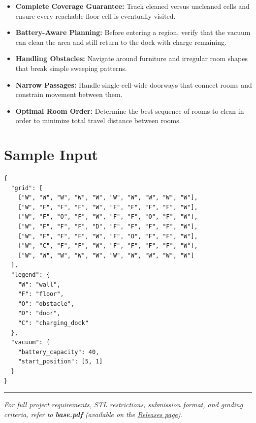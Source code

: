 \begin{itemize}
  \item \textbf{Complete Coverage Guarantee:} Track cleaned versus uncleaned cells and ensure every reachable floor cell is eventually visited.
  \item \textbf{Battery-Aware Planning:} Before entering a region, verify that the vacuum can clean the area and still return to the dock with charge remaining.
  \item \textbf{Handling Obstacles:} Navigate around furniture and irregular room shapes that break simple sweeping patterns.
  \item \textbf{Narrow Passages:} Handle single-cell-wide doorways that connect rooms and constrain movement between them.
  \item \textbf{Optimal Room Order:} Determine the best sequence of rooms to clean in order to minimize total travel distance between rooms.
\end{itemize}

\section{Sample Input}

\begin{lstlisting}[style=json, caption={data/input\_sample.json}]
{
  "grid": [
    ["W", "W", "W", "W", "W", "W", "W", "W", "W", "W"],
    ["W", "F", "F", "F", "W", "F", "F", "F", "F", "W"],
    ["W", "F", "O", "F", "W", "F", "F", "O", "F", "W"],
    ["W", "F", "F", "F", "D", "F", "F", "F", "F", "W"],
    ["W", "F", "F", "F", "W", "F", "O", "F", "F", "W"],
    ["W", "C", "F", "F", "W", "F", "F", "F", "F", "W"],
    ["W", "W", "W", "W", "W", "W", "W", "W", "W", "W"]
  ],
  "legend": {
    "W": "wall",
    "F": "floor",
    "O": "obstacle",
    "D": "door",
    "C": "charging_dock"
  },
  "vacuum": {
    "battery_capacity": 40,
    "start_position": [5, 1]
  }
}
\end{lstlisting}

\vfill
\noindent\rule{\textwidth}{0.4pt}
{\small\textit{For full project requirements, STL restrictions, submission format, and grading criteria, refer to \textbf{base.pdf} (available on the \href{https://github.com/BestSithInEU/cse211-term-projects/releases}{Releases page}).}}
